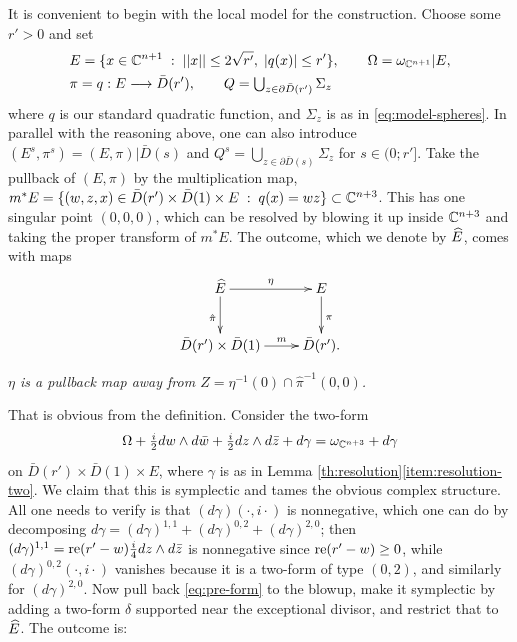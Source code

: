 \documentclass[10pt,letterpaper]{article}
\begin{document}
It is convenient to begin with the local model for the construction. Choose
some $r'>0$ and set
\begin{equation} \label{eq:cylinder}
\begin{split}
 & E = \{x \in \mathbb{C}^{n+1} \; : \; ||x|| \leq 2\sqrt{r'},\; |q(x)| \leq r'\},
 \qquad \Omega = \omega_{\mathbb{C}^{n+1}}|E, \\
 & \pi = q: E \longrightarrow \bar{D}(r'),
 \qquad Q = \textstyle \bigcup_{z \in \partial \bar{D}(r')} \Sigma_z
\end{split}
\end{equation}
where $q$ is our standard quadratic function, and $\Sigma_z$ is as in
\eqref{eq:model-spheres}. In parallel with the reasoning above, one can also
introduce $(E^s,\pi^s) = (E,\pi)|\bar{D}(s)$ and $Q^s = \bigcup_{z \in \partial
\bar{D}(s)} \Sigma_z$ for $s \in (0;r']$. Take the pullback of $(E,\pi)$ by the
multiplication map, $m^*E = \{(w,z,x) \in \bar{D}(r') \times \bar{D}(1) \times
E \; : \; q(x) = wz\} \subset \mathbb{C}^{n+3}$. This has one singular point
$(0,0,0)$, which can be resolved by blowing it up inside $\mathbb{C}^{n+3}$ and taking
the proper transform of $m^*E$. The outcome, which we denote by $\widehat{E}$, comes
with maps
\[
\xymatrix{
 {\hatE} \ar[r]^{\eta} \ar[d]_{\hat\pi} & {E} \ar[d]^{\pi} \\
 {\bar{D}(r') \times \bar{D}(1)} \ar[r]^-{m} & {\bar{D}(r')}.
}
\]
\begin{condensedprimelist}
\item \label{item:model-resolution-one} \em
$\eta$ is a pullback map away from $Z = \eta^{-1}(0) \cap \hat\pi^{-1}(0,0)$.
\end{condensedprimelist}
That is obvious from the definition. Consider the two-form
\begin{equation} \label{eq:pre-form} \Omega + \textstyle
\frac{i}{2} dw \wedge d\bar{w} + \frac{i}{2} dz \wedge d\bar{z} + d\gamma =
\omega_{\mathbb{C}^{n+3}} + d\gamma
\end{equation}
on $\bar{D}(r') \times \bar{D}(1) \times E$, where $\gamma$ is as in Lemma
\ref{th:resolution}\ref{item:resolution-two}. We claim that this is symplectic
and tames the obvious complex structure. All one needs to verify is that
$(d\gamma)(\cdot,i\cdot)$ is nonnegative, which one can do by decomposing
$d\gamma = (d\gamma)^{1,1} + (d\gamma)^{0,2} + (d\gamma)^{2,0}$; then
$(d\gamma)^{1,1} = \mathrm{re}(r'-w)\frac{i}{4} dz \wedge d\bar{z}$ is nonnegative
since $\mathrm{re}(r'-w) \geq 0$, while $(d\gamma)^{0,2}(\cdot,i\cdot)$ vanishes
because it is a two-form of type $(0,2)$, and similarly for $(d\gamma)^{2,0}$.
Now pull back \eqref{eq:pre-form} to the blowup, make it symplectic by adding a
two-form $\delta$ supported near the exceptional divisor, and restrict that to
$\widehat{E}$. The outcome is:
\end{document}
